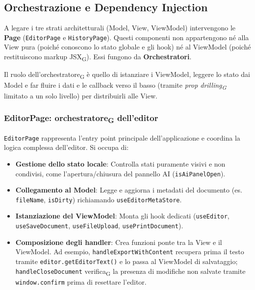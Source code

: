 \documentclass[11pt,a4paper]{article}
\newcommand{\gls}[1]{#1\textsubscript{G}}
\begin{document}
\subsection{Orchestrazione e Dependency Injection}
A legare i tre strati architetturali (Model, View, ViewModel) intervengono le \textbf{Page} (\texttt{EditorPage} e \texttt{HistoryPage}). Questi componenti non appartengono né alla View pura (poiché conoscono lo stato globale e gli hook) né al ViewModel (poiché restituiscono markup \gls{JSX}). Essi fungono da \textbf{Orchestratori}.

Il ruolo dell'\gls{orchestratore} è quello di istanziare i ViewModel, leggere lo stato dai Model e far fluire i dati e le callback verso il basso (tramite \textit{\gls{prop drilling}} limitato a un solo livello) per distribuirli alle View.

\subsubsection{EditorPage: \gls{orchestratore} dell'editor}
\texttt{EditorPage} rappresenta l'entry point principale dell'applicazione e coordina la logica complessa dell'editor. Si occupa di:
\begin{itemize}
    \item \textbf{Gestione dello stato locale}: Controlla stati puramente visivi e non condivisi, come l'apertura/chiusura del pannello AI (\texttt{isAiPanelOpen}).
    \item \textbf{Collegamento al Model}: Legge e aggiorna i metadati del documento (es. \texttt{fileName}, \texttt{isDirty}) richiamando \texttt{useEditorMetaStore}.
    \item \textbf{Istanziazione del ViewModel}: Monta gli hook dedicati (\texttt{useEditor}, \texttt{useSaveDocument}, \texttt{useFileUpload}, \texttt{usePrintDocument}).
    \item \textbf{Composizione degli handler}: Crea funzioni ponte tra la View e il ViewModel. Ad esempio, \texttt{handleExportWithContent} recupera prima il testo tramite \texttt{editor.getEditorText()} e lo passa al ViewModel di salvataggio; \texttt{handleCloseDocument} \gls{verifica} la presenza di modifiche non salvate tramite \texttt{window.confirm} prima di resettare l'editor.
\end{itemize}
\end{document}
